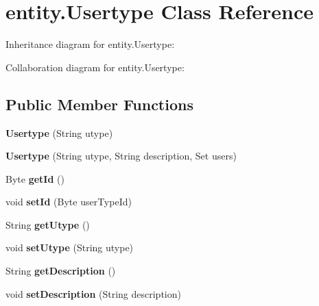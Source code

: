 \hypertarget{classentity_1_1_usertype}{}\section{entity.\+Usertype Class Reference}
\label{classentity_1_1_usertype}


Inheritance diagram for entity.\+Usertype\+:


Collaboration diagram for entity.\+Usertype\+:
\subsection*{Public Member Functions}
\begin{DoxyCompactItemize}
\item 
\mbox{\label{classentity_1_1_usertype_aa083fa44ce7903b3dcf3e78c945b6836}} 
{\bfseries Usertype} (String utype)
\item 
\mbox{\label{classentity_1_1_usertype_a5ab68453326f5dec6ddd08ffd294c634}} 
{\bfseries Usertype} (String utype, String description, Set users)
\item 
\mbox{\label{classentity_1_1_usertype_abc30017ed5bcf3cb9b099e02e75519b2}} 
Byte {\bfseries get\+Id} ()
\item 
\mbox{\label{classentity_1_1_usertype_ae5675c6f464700f9b626ca36f0a88a2f}} 
void {\bfseries set\+Id} (Byte user\+Type\+Id)
\item 
\mbox{\label{classentity_1_1_usertype_ac14deb5f7632893ca5d9c4fd90ca51d5}} 
String {\bfseries get\+Utype} ()
\item 
\mbox{\label{classentity_1_1_usertype_a551750f9e5f868d3811be4647a46cf2b}} 
void {\bfseries set\+Utype} (String utype)
\item 
\mbox{\label{classentity_1_1_usertype_a1699b78e303deb9b70224bf863b08063}} 
String {\bfseries get\+Description} ()
\item 
\mbox{\label{classentity_1_1_usertype_ab274da7bcfaa15606599fc856b958d24}} 
void {\bfseries set\+Description} (String description)
\end{DoxyCompactItemize}



